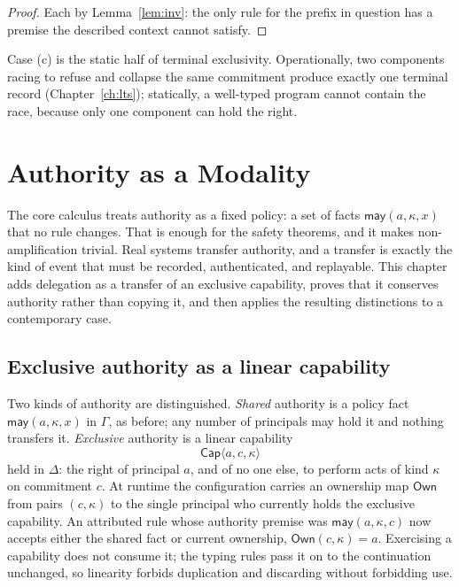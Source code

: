\documentclass[11pt,openany]{book}
\theoremstyle{remark}
\begin{document}
\begin{proof}
Each by Lemma~\ref{lem:inv}: the only rule for the prefix in question has
a premise the described context cannot satisfy.
\end{proof}

Case (c) is the static half of terminal exclusivity. Operationally, two
components racing to refuse and collapse the same commitment produce
exactly one terminal record (Chapter~\ref{ch:lts}); statically, a
well-typed program cannot contain the race, because only one component can
hold the right.

\chapter{Authority as a Modality}
\label{ch:authority}

The core calculus treats authority as a fixed policy: a set of facts
$\mathsf{may}(a,\kappa,x)$ that no rule changes. That is enough for the
safety theorems, and it makes non-amplification trivial. Real systems
transfer authority, and a transfer is exactly the kind of event that must
be recorded, authenticated, and replayable. This chapter adds delegation
as a transfer of an exclusive capability, proves that it conserves
authority rather than copying it, and then applies the resulting
distinctions to a contemporary case.

\section{Exclusive authority as a linear capability}

Two kinds of authority are distinguished. \emph{Shared} authority is a
policy fact $\mathsf{may}(a,\kappa,x)$ in $\Gamma$, as before; any number
of principals may hold it and nothing transfers it. \emph{Exclusive}
authority is a linear capability
\[
\mathsf{Cap}\langle a,c,\kappa\rangle
\]
held in $\Delta$: the right of principal $a$, and of no one else, to
perform acts of kind $\kappa$ on commitment $c$. At runtime the
configuration carries an ownership map $\mathsf{Own}$ from pairs
$(c,\kappa)$ to the single principal who currently holds the exclusive
capability. An attributed rule whose authority premise was
$\mathsf{may}(a,\kappa,c)$ now accepts either the shared fact or current
ownership, $\mathsf{Own}(c,\kappa)=a$. Exercising a capability does not
consume it; the typing rules pass it on to the continuation unchanged, so
linearity forbids duplication and discarding without forbidding use.
\end{document}

